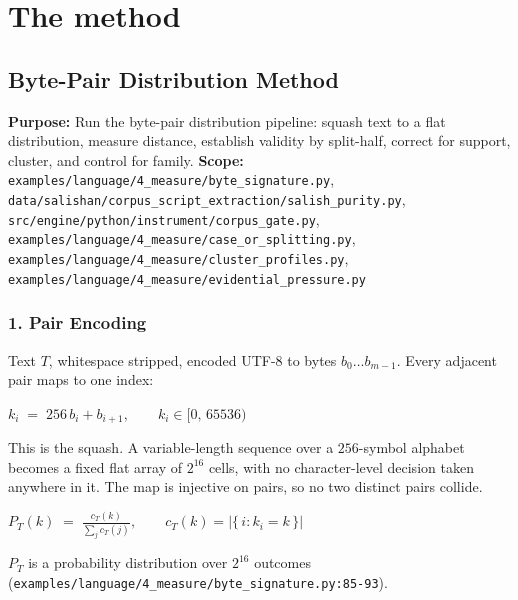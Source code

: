\chapter{The method}

\section{Byte-Pair Distribution Method}

\textbf{Purpose:} Run the byte-pair distribution pipeline: squash text to a flat distribution, measure distance, establish validity by split-half, correct for support, cluster, and control for family. \textbf{Scope:} \texttt{examples/\allowbreak{}language/\allowbreak{}4\_\allowbreak{}measure/\allowbreak{}byte\_\allowbreak{}signature.\allowbreak{}py}, \texttt{data/\allowbreak{}salishan/\allowbreak{}corpus\_\allowbreak{}script\_\allowbreak{}extraction/\allowbreak{}salish\_\allowbreak{}purity.\allowbreak{}py}, \texttt{src/\allowbreak{}engine/\allowbreak{}python/\allowbreak{}instrument/\allowbreak{}corpus\_\allowbreak{}gate.\allowbreak{}py}, \texttt{examples/\allowbreak{}language/\allowbreak{}4\_\allowbreak{}measure/\allowbreak{}case\_\allowbreak{}or\_\allowbreak{}splitting.\allowbreak{}py}, \texttt{examples/\allowbreak{}language/\allowbreak{}4\_\allowbreak{}measure/\allowbreak{}cluster\_\allowbreak{}profiles.\allowbreak{}py}, \texttt{examples/\allowbreak{}language/\allowbreak{}4\_\allowbreak{}measure/\allowbreak{}evidential\_\allowbreak{}pressure.\allowbreak{}py}

\subsection{1. Pair Encoding}

Text \(T\), whitespace stripped, encoded UTF-8 to bytes \(b_0 \dots b_{m-1}\). Every adjacent pair maps to one index:

\(k_i \;=\; 256\,b_i + b_{i+1}, \qquad k_i \in [0,\,65536)\)

This is the squash. A variable-length sequence over a \(256\)-symbol alphabet becomes a fixed flat array of \(2^{16}\) cells, with no character-level decision taken anywhere in it. The map is injective on pairs, so no two distinct pairs collide.

\(P_T(k) \;=\; \frac{c_T(k)}{\sum_{j} c_T(j)}, \qquad c_T(k) = \bigl|\{\, i : k_i = k \,\}\bigr|\)

\(P_T\) is a probability distribution over \(2^{16}\) outcomes (\texttt{examples/\allowbreak{}language/\allowbreak{}4\_\allowbreak{}measure/\allowbreak{}byte\_\allowbreak{}signature.\allowbreak{}py:85-\allowbreak{}93}).

